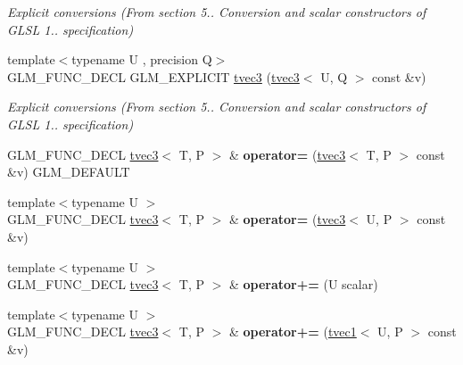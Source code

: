 \begin{DoxyCompactItemize}
\begin{DoxyCompactList}\small\item\em Explicit conversions (From section 5.. Conversion and scalar constructors of G\-L\-S\-L 1.. specification) \end{DoxyCompactList}\item 
\hypertarget{structglm_1_1tvec3_a0c5689584d9f174f88fb0dea6e510adb}{{\footnotesize template$<$typename U , precision Q$>$ }\\G\-L\-M\-\_\-\-F\-U\-N\-C\-\_\-\-D\-E\-C\-L G\-L\-M\-\_\-\-E\-X\-P\-L\-I\-C\-I\-T \hyperlink{structglm_1_1tvec3_a0c5689584d9f174f88fb0dea6e510adb}{tvec3} (\hyperlink{structglm_1_1tvec3}{tvec3}$<$ U, Q $>$ const \&v)}\label{structglm_1_1tvec3_a0c5689584d9f174f88fb0dea6e510adb}

\begin{DoxyCompactList}\small\item\em Explicit conversions (From section 5.. Conversion and scalar constructors of G\-L\-S\-L 1.. specification) \end{DoxyCompactList}\item 
\hypertarget{structglm_1_1tvec3_ad790b1fabd3d2c5e77324f6812be2e1b}{G\-L\-M\-\_\-\-F\-U\-N\-C\-\_\-\-D\-E\-C\-L \hyperlink{structglm_1_1tvec3}{tvec3}$<$ T, P $>$ \& {\bfseries operator=} (\hyperlink{structglm_1_1tvec3}{tvec3}$<$ T, P $>$ const \&v) G\-L\-M\-\_\-\-D\-E\-F\-A\-U\-L\-T}\label{structglm_1_1tvec3_ad790b1fabd3d2c5e77324f6812be2e1b}

\item 
\hypertarget{structglm_1_1tvec3_aff4967c521c4bc8f009eed5db29c9406}{{\footnotesize template$<$typename U $>$ }\\G\-L\-M\-\_\-\-F\-U\-N\-C\-\_\-\-D\-E\-C\-L \hyperlink{structglm_1_1tvec3}{tvec3}$<$ T, P $>$ \& {\bfseries operator=} (\hyperlink{structglm_1_1tvec3}{tvec3}$<$ U, P $>$ const \&v)}\label{structglm_1_1tvec3_aff4967c521c4bc8f009eed5db29c9406}

\item 
\hypertarget{structglm_1_1tvec3_af22cc44c2405f4db35bc67994a5b0c50}{{\footnotesize template$<$typename U $>$ }\\G\-L\-M\-\_\-\-F\-U\-N\-C\-\_\-\-D\-E\-C\-L \hyperlink{structglm_1_1tvec3}{tvec3}$<$ T, P $>$ \& {\bfseries operator+=} (U scalar)}\label{structglm_1_1tvec3_af22cc44c2405f4db35bc67994a5b0c50}

\item 
\hypertarget{structglm_1_1tvec3_acfd1571d1fab5431b44fdad4d63f3134}{{\footnotesize template$<$typename U $>$ }\\G\-L\-M\-\_\-\-F\-U\-N\-C\-\_\-\-D\-E\-C\-L \hyperlink{structglm_1_1tvec3}{tvec3}$<$ T, P $>$ \& {\bfseries operator+=} (\hyperlink{structglm_1_1tvec1}{tvec1}$<$ U, P $>$ const \&v)}\label{structglm_1_1tvec3_acfd1571d1fab5431b44fdad4d63f3134}


\end{DoxyCompactItemize}
